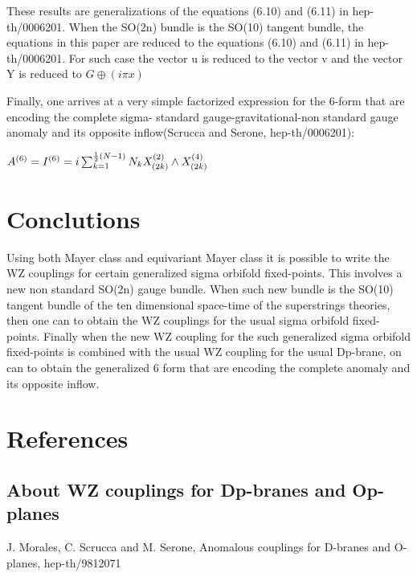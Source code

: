 \documentclass[a4paper,a4paper]{article}
\begin{document}
These results are generalizations of the equations (6.10) and (6.11) in hep-th/0006201.  When the SO(2n) bundle is the SO(10) tangent bundle, the equations in this paper are reduced to the equations (6.10) and (6.11) in hep-th/0006201.  For such case the vector u is reduced to the vector v and the vector Y is reduced to $G\oplus{(i\pi{x})}$

Finally, one arrives at a very simple factorized expression for the 6-form that are encoding the complete sigma- standard gauge-gravitational-non standard gauge anomaly and its opposite inflow(Scrucca and Serone, hep-th/0006201):

\begin{center}
{  $ A^{(6)} =I^{(6)} = i\sum_{k=1}^{\frac{\rm 1}{\rm 2}(N-1)}N_{k}X_{(2k)}^{(2)}\wedge{X_{(2k)}^{(4)}}$ }
\end{center}








 
\section{Conclutions}

Using both Mayer class and equivariant Mayer class it is possible to write the WZ couplings for certain generalized sigma orbifold fixed-points.  This involves a new non standard SO(2n) gauge bundle.  When such new bundle is the SO(10) tangent bundle of the ten dimensional space-time of the superstrings theories, then one can to obtain the WZ couplings for the usual 
sigma orbifold fixed-points. Finally when the new WZ coupling for the such generalized sigma orbifold fixed-points is combined with the usual WZ coupling for the usual Dp-brane, on can to obtain the generalized 6 form that are encoding the complete anomaly and its opposite inflow.




\section{References}


\subsection{About WZ couplings  for Dp-branes and Op-planes}
\setlength{\baselineskip}{20pt}
J. Morales, C. Scrucca and M. Serone, Anomalous couplings for D-branes and O-planes, hep-th/9812071
\end{document}
